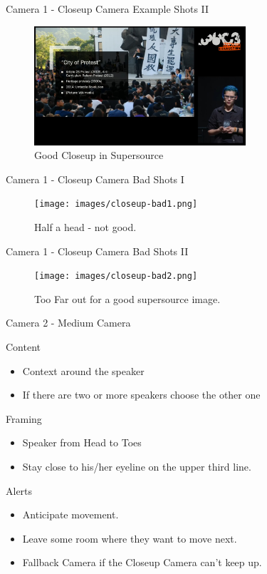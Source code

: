 \documentclass[aspectratio=169]{beamer}
\begin{document}
\begin{frame}{Camera 1 - Closeup Camera}
	Example Shots II
	\begin{figure} 
		\centering
		\includegraphics[width=0.7\textwidth]{images/closeup2.jpg}
		\caption{Good Closeup in Supersource}
	\end{figure}
\end{frame}

\begin{frame}{Camera 1 - Closeup Camera}
	Bad Shots I
	\begin{figure} 
		\centering
		\texttt{[image: images/closeup-bad1.png]}
		\caption{Half a head - not good.}
	\end{figure}
\end{frame}

\begin{frame}{Camera 1 - Closeup Camera}
	Bad Shots II
	\begin{figure} 
		\centering
		\texttt{[image: images/closeup-bad2.png]}
		\caption{Too Far out for a good supersource image.}
	\end{figure}
\end{frame}


\begin{frame}{Camera 2 - Medium Camera}
		\begin{block}{Content}
			\begin{itemize}
				\item Context around the speaker
				\item If there are two or more speakers choose the other one
			\end{itemize}
		\end{block}
		
		\begin{block}{Framing}
			\begin{itemize}
				\item Speaker from Head to Toes
				\item Stay close to his/her eyeline on the upper third line.
			\end{itemize}
		\end{block}

		\begin{alertblock}{Alerts}
			\begin{itemize}
				\item Anticipate movement.
				\item Leave some room where they want to move next.
				\item Fallback Camera if the Closeup Camera can't keep up.
			\end{itemize}
		\end{alertblock}
\end{frame}
\end{document}
